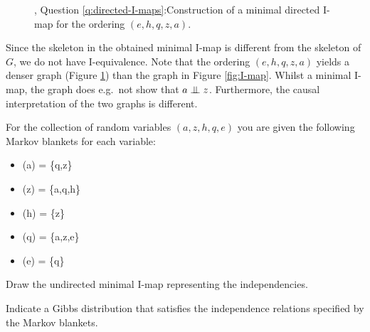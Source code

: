 \begin{exenumerate}
\begin{solution}
\begin{figure}[h]
{}
      \hspace{1ex}
      \hspace{1ex}
      \caption{\label{fig:I-map2} , Question \ref{q:directed-I-maps}:Construction of a minimal directed I-map for the ordering $(e,h,q,z,a)$. }
    \end{figure}

Since the skeleton in the obtained minimal I-map is different from the
skeleton of $G$, we do not have I-equivalence. Note that the ordering
$(e,h,q,z,a)$ yields a denser graph (Figure \ref{fig:I-map2}) than the
graph in Figure \ref{fig:I-map}. Whilst a minimal I-map, the graph does
e.g.\ not show that $a \mathrel{\perp\mspace{-10mu}\perp} z$. Furthermore, the causal
interpretation of the two graphs is different.

  \end{solution}

\item For the collection of random variables $(a,z,h,q,e)$ you are given the following Markov blankets for each variable:
  \begin{itemize}
  \item \MB(a) = \{q,z\}
  \item \MB(z) = \{a,q,h\}
  \item \MB(h) = \{z\}
  \item \MB(q) = \{a,z,e\}
  \item \MB(e) = \{q\}
  \end{itemize}
  \begin{exenumerate}
    \item Draw the undirected minimal I-map representing the independencies.
    \item Indicate a Gibbs distribution that satisfies the independence relations specified by the Markov blankets.
  \end{exenumerate}


\end{exenumerate}

